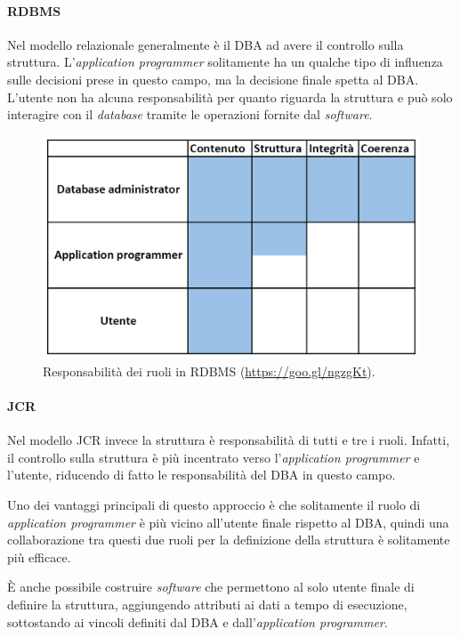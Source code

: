 \begin{enumerate}
			
			\paragraph{RDBMS} 
				Nel modello relazionale generalmente è il DBA ad avere il controllo sulla struttura. L'\textit{application programmer} solitamente ha un qualche tipo di influenza sulle decisioni prese in questo campo, ma la decisione finale spetta al DBA. L'utente non ha alcuna responsabilità per quanto riguarda la struttura e può solo interagire con il \textit{database} tramite le operazioni fornite dal \textit{software}.
				
				\begin{figure}[H]
					\centering
					\includegraphics[scale=0.4]{immagini/ruoli-r}
					\caption{Responsabilità dei ruoli in RDBMS (\url{https://goo.gl/ngzgKt}).}
				\end{figure}
			
			
			\paragraph{JCR} 
				Nel modello JCR invece la struttura è responsabilità di tutti e tre i ruoli. Infatti, il controllo sulla struttura è più incentrato verso l'\textit{application programmer} e l'utente, riducendo di fatto le responsabilità del DBA in questo campo.
				
				
				Uno dei vantaggi principali di questo approccio è che solitamente il ruolo di \textit{application programmer} è più vicino all'utente finale rispetto al DBA, quindi una collaborazione tra questi due ruoli per la definizione della struttura è solitamente più efficace.
				
				
				È anche possibile costruire \textit{software} che permettono al solo utente finale di definire la struttura, aggiungendo attributi ai dati a tempo di esecuzione, sottostando ai vincoli definiti dal DBA e dall'\textit{application programmer}.
				

\end{enumerate}
